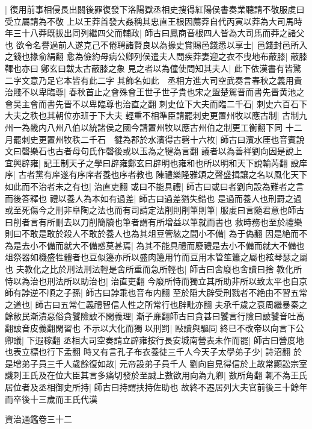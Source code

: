 |{
	復用前事相侵長出關後罪復發下洛陽獄丞相史搜得紅陽侯書奏業聽請不敬服䖍曰受立屬請為不敬}
上以王莽首發大姦稱其忠直王根因薦莽自代丙寅以莽為大司馬時年三十八莽既拔出同列繼四父而輔政|{
	師古曰鳳商音根四人皆為大司馬而莽之諸父也}
欲令名譽過前人遂克己不倦聘諸賢良以為掾史賞賜邑錢悉以享士|{
	邑錢封邑所入之錢也掾俞絹翻}
愈為儉約母病公卿列侯遣夫人問疾莽妻迎之衣不曳地布蔽膝|{
	蔽膝鞸也亦曰鄭玄曰韍太古蔽膝之象}
見之者以為僮使問知其夫人|{
	此下依漢書有皆驚二字文意乃足它本皆有此二字}
其飾名如此　丞相方進大司空武奏言春秋之義用貴治賤不以卑臨尊|{
	春秋首止之會殊會王世子世子貴也宋之盟楚駕晋而書先晋黄池之會吴主會而書先晋不以卑臨尊也治直之翻}
刺史位下大夫而臨二千石|{
	刺史六百石下大夫之秩也其朝位亦班于下大夫}
輕重不相準臣請罷刺史更置州牧以應古制|{
	古制九州一為畿内八州八伯以統諸侯之國今請置州牧以應古州伯之制更工衡翻下同}
十二月罷刺史更置州牧秩二千石　犍為郡於水濱得古磬十六枚|{
	師古曰濱水厓也音賓說文曰磬樂石也古者母句氏作磬後或以玉為之犍為言翻}
議者以為善祥劉向因是說上宜興辟雍|{
	記王制天子之學曰辟雍鄭玄曰辟明也雍和也所以明和天下說輸芮翻}
設庠序|{
	古者黨有庠遂有序庠者養也序者教也}
陳禮樂隆雅頌之聲盛揖讓之名以風化天下如此而不治者未之有也|{
	治直吏翻}
或曰不能具禮|{
	師古曰或曰者劉向設為難者之言而後答釋也}
禮以養人為本如有過差|{
	師古曰過差猶失錯也}
是過而養人也刑罸之過或至死傷今之刑非臯陶之法也而有司請定法削則削筆則筆|{
	服䖍曰言隨君意也師古曰削者言有所刪去以刀削簡牘也筆者謂有所增益以筆就而書也}
救時務也至於禮樂則曰不敢是敢於殺人不敢於養人也為其俎豆管絃之間小不備|{
	為于偽翻}
因是絶而不為是去小不備而就大不備惑莫甚焉|{
	為其不能具禮而廢禮是去小不備而就大不備也俎祭器如機盛牲體者也豆似籩亦所以盛肉籩用竹而豆用木管笙簫之屬也絃琴瑟之屬也}
夫教化之比於刑法刑法輕是舍所重而急所輕也|{
	師古曰舍廢也舍讀曰捨}
教化所恃以為治也刑法所以助治也|{
	治直吏翻}
今廢所恃而獨立其所助非所以致太平也自京師有誖逆不順之子孫|{
	師古曰誖乖也音布内翻}
至於䧟大辟受刑戮者不絶由不習五常之道也|{
	師古曰五常仁義禮智信人性之所常行也辟毗亦翻}
夫承千歲之衰周繼暴秦之餘敝民漸漬惡俗貪饕險詖不閑義理|{
	漸子亷翻師古曰貪甚曰饕言行險曰詖饕音吐高翻詖音皮義翻閑習也}
不示以大化而獨以刑罰|{
	敺讀與驅同}
終已不改帝以向言下公卿議|{
	下遐稼翻}
丞相大司空奏請立辟雍按行長安城南營表未作而罷|{
	師古曰營度地也表立標也行下孟翻}
時又有言孔子布衣養徒三千人今天子太學弟子少|{
	詩沼翻}
於是增弟子員三千人歲餘復如故|{
	元帝設弟子員千人}
劉向自見得信於上故常顯訟宗室譏刺王氏及在位大臣其言多痛切發於至誠上數欲用向為九卿|{
	數所角翻}
輒不為王氏居位者及丞相御史所持|{
	師古曰持謂扶持佐助也}
故終不遷居列大夫官前後三十餘年而卒後十三歲而王氏代漢

資治通鑑卷三十二
